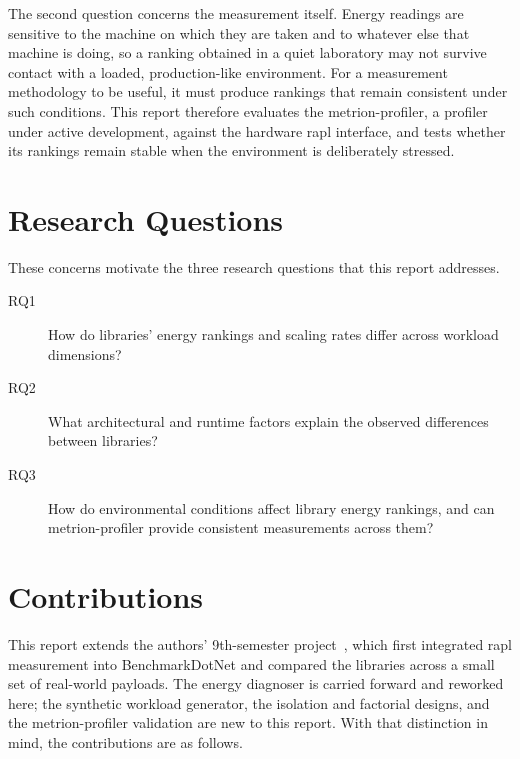The second question concerns the measurement itself. Energy readings are
sensitive to the machine on which they are taken and to whatever else that
machine is doing, so a ranking obtained in a quiet laboratory may not survive
contact with a loaded, production-like environment. For a measurement
methodology to be useful, it must produce rankings that remain consistent
under such conditions. This report therefore evaluates the
\gls{metrion-profiler}, a profiler under active development, against the
hardware \gls{rapl} interface, and tests whether its rankings remain stable
when the environment is deliberately stressed.

\section{Research Questions}
\label{sec:intro-rqs}

These concerns motivate the three research questions that this report
addresses.

\begin{description}
  \item[RQ1] How do libraries' energy rankings and scaling rates differ
    across workload dimensions?
  \item[RQ2] What architectural and runtime factors explain the observed
    differences between libraries?
  \item[RQ3] How do environmental conditions affect library energy rankings,
    and can \gls{metrion-profiler} provide consistent measurements across
    them?
\end{description}

\section{Contributions}
\label{sec:intro-contributions}

This report extends the authors' 9th-semester
project~\cite{geotoms2025microbenchmarking}, which first integrated \gls{rapl}
measurement into BenchmarkDotNet and compared the libraries across a small set
of real-world payloads. The energy diagnoser is carried forward and reworked
here; the synthetic workload generator, the isolation and factorial designs,
and the \gls{metrion-profiler} validation are new to this report. With that
distinction in mind, the contributions are as follows.

